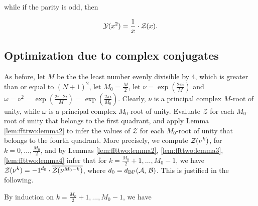 while if the parity is odd, then

\begin{align}
\label{eq:ffttwo:oddY}
\emYof{}{x^2} = \frac{1}{x} \cdot \fullZx.
\end{align}

\subsection{Optimization due to complex conjugates}
\label{subsec:ffttwo:compconj}

As before, let $M$ be the the least number evenly divisible by 4, which is
greater than or equal to $(N+1)^2$, let $M_0=\frac{M}{2}$, let $\nu = \exp(\frac{2 \pi i}{M})$
and $\omega=\nu^2 = \exp(\frac{2 \pi \cdot 2i}{M}) =
\exp(\frac{2 \pi i}{M_0})$. Clearly, $\nu$ is a principal complex
$M$-root of unity, while $\omega$ is a principal complex $M_0$-root
of unity. Evaluate $\mathcal Z$ for each $M_0$-root of unity
that belongs to the first quadrant, and apply Lemma \ref{lem:ffttwo:lemma2}
 to infer the values
of $\mathcal Z$ for each $M_0$-root of unity that belongs to the
fourth quadrant. More precisely,
we compute ${\mathcal Z}_{}(\nu^k)$, for $k=0,\dots,\frac{M_0}{2}$, and by Lemmas
\ref{lem:ffttwo:lemma2}, \ref{lem:ffttwo:lemma3}, \ref{lem:ffttwo:lemma4} infer
that for $k=\frac{M_0}{2}+1,\dots,M_0-1$, we have
${\mathcal Z}_{}(\nu^{k})= -1^{d_0} \cdot \overline{{\mathcal Z}_{}(\nu^{M_0-k})}$,
where
$d_0 = d_{\text{BP}}(\mathcal A,\,\mathcal B)$. This is justified in the following.

By induction on $k=\frac{M_0}{2}+1,\dots,M_0-1$, we have

\newlength{\maxLengthCases}

